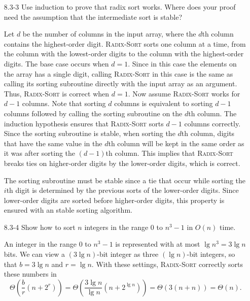 \begin{enumerate}
\item[8.3-3]{Use induction to prove that radix sort works. Where does your proof
need the assumption that the intermediate sort is stable?}

\begin{framed}
Let $d$ be the number of columns in the input array, where the $d$th column
contains the highest-order digit. \textsc{Radix-Sort} sorts one column at
a time, from the column with the lowest-order digits to the column with the
highest-order digits. The base case occurs when $d = 1$. Since in this case the
elements on the array has a single digit, calling \textsc{Radix-Sort} in this
case is the same as calling its sorting subroutine directly with the input array
as an argument. Thus, \textsc{Radix-Sort} is correct when $d = 1$. Now assume
\textsc{Radix-Sort} works for $d - 1$ columns. Note that sorting $d$ columns is
equivalent to sorting $d - 1$ columns followed by calling the sorting subroutine
on the $d$th column. The induction hypothesis ensures that \textsc{Radix-Sort}
sorts $d - 1$ columns correctly. Since the sorting subroutine is stable, when
sorting the $d$th column, digits that have the same value in the $d$th column
will be kept in the same order as it was after sorting the $(d - 1)$th column.
This implies that \textsc{Radix-Sort} breaks ties on higher-order digits by the
lower-order digits, which is correct.

The sorting subroutine must be stable since a tie that occur while sorting the
$i$th digit is determined by the previous sorts of the lower-order digits. Since
lower-order digits are sorted before higher-order digits, this property is
ensured with an stable sorting algorithm.
\end{framed}

\item[8.3-4]{Show how to sort $n$ integers in the range $0$ to $n^3 - 1$ in
$O(n)$ time.}

\begin{framed}
An integer in the range $0$ to $n^3 - 1$ is represented with at most
$\lg n^3 = 3 \lg n$ bits. We can view a $(3 \lg n)$-bit integer as three
$(\lg n)$-bit integers, so that $b = 3 \lg n$ and $r = \lg n$. With these
settings, \textsc{Radix-Sort} correctly sorts these numbers in
\[
  \Theta\left( \frac{b}{r} \left( n + 2^r \right) \right)
  = \Theta\left( \frac{3 \lg n}{\lg n} \left(n + 2^{\lg n}\right) \right)
  = \Theta( 3 (n + n) )
  = \Theta(n).
\]
\end{framed}


\end{enumerate}
